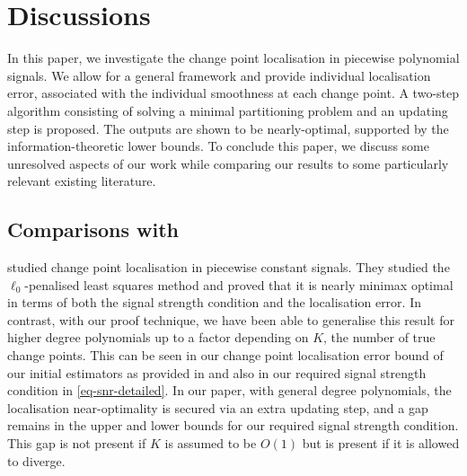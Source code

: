 \documentclass{article}
\begin{document}
\section{Discussions} \label{sec-discussion}

In this paper, we investigate the change point localisation in piecewise polynomial signals.  We allow for a general framework and provide individual localisation error, associated with the individual smoothness at each change point.  A two-step algorithm consisting of solving a minimal partitioning problem and an updating step is proposed.  The outputs are shown to be nearly-optimal, supported by the information-theoretic lower bounds.  To conclude this paper, we discuss some unresolved aspects of our work while comparing our results to some particularly relevant existing literature. 


\subsection{Comparisons with \cite{wang2020univariate}}\label{sec-comparisons}

\cite{wang2020univariate} studied change point localisation in piecewise constant signals.  They studied the $\ell_0$-penalised least squares method and proved that it is nearly minimax optimal in terms of both the signal strength condition and the localisation error.  In contrast, with our proof technique, we have been able to generalise this result for higher degree polynomials up to a factor depending on $K$, the number of true change points.  This can be seen in our change point localisation error bound of our initial estimators as provided in  and also in our required signal strength condition in \eqref{eq-snr-detailed}.  In our paper, with general degree polynomials, the localisation near-optimality is secured via an extra updating step, and a gap remains in the upper and lower bounds for our required signal strength condition. This gap is not present if $K$ is assumed to be $O(1)$ but is present if it is allowed to diverge. 
\end{document}
